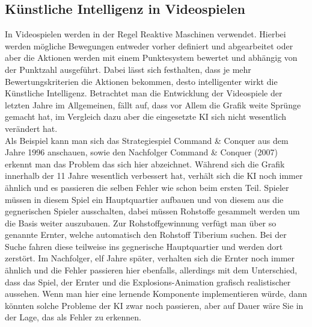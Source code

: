 \subsection{Künstliche Intelligenz in Videospielen}
\label{ch:Grundlagen:sec:Abschnitt3}
\nocite{tecchannel}
In Videospielen werden in der Regel Reaktive Maschinen verwendet. Hierbei werden mögliche Bewegungen entweder vorher definiert und abgearbeitet oder aber die Aktionen werden mit einem Punktesystem bewertet und abhängig von der Punktzahl ausgeführt. Dabei lässt sich festhalten, dass je mehr Bewertungskriterien die Aktionen bekommen, desto intelligenter wirkt die Künstliche Intelligenz. Betrachtet man die Entwicklung der Videospiele der letzten Jahre im Allgemeinen, fällt auf, dass vor Allem die Grafik weite Sprünge gemacht hat, im Vergleich dazu aber die eingesetzte KI sich nicht wesentlich verändert hat.\\
Als Beispiel kann man sich das Strategiespiel Command \& Conquer aus dem Jahre 1996 anschauen, sowie den Nachfolger Command \& Conquer (2007) erkennt man das Problem das sich hier abzeichnet. Während sich die Grafik innerhalb der 11 Jahre wesentlich verbessert hat, verhält sich die KI noch immer ähnlich und es passieren die selben Fehler wie schon beim ersten Teil. Spieler müssen in diesem Spiel ein Hauptquartier aufbauen und von diesem aus die gegnerischen Spieler ausschalten, dabei müssen Rohstoffe gesammelt werden um die Basis weiter auszubauen. Zur Rohstoffgewinnung verfügt man über so genannte Ernter, welche automatisch den Rohstoff Tiberium suchen. Bei der Suche fahren diese teilweise ins gegnerische Hauptquartier und werden dort zerstört. Im Nachfolger, elf Jahre später, verhalten sich die Ernter noch immer ähnlich und die Fehler passieren hier ebenfalls, allerdings mit dem Unterschied, dass das Spiel, der Ernter und die Explosions-Animation grafisch realistischer aussehen. Wenn man hier eine lernende Komponente implementieren würde, dann könnten solche Probleme der KI zwar noch passieren, aber auf Dauer wäre Sie in der Lage, das als Fehler zu erkennen. \\

